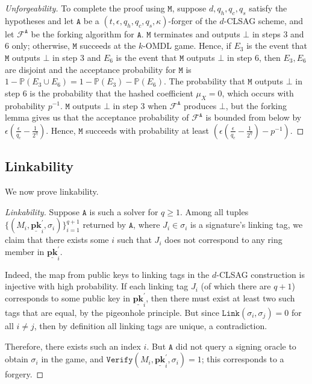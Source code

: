 \documentclass[draft]{llncs} %
\begin{document}
\begin{proof}[Unforgeability]
To complete the proof using $\texttt{M}$, suppose $d, q_h, q_c, q_s$ satisfy the hypotheses and let $\texttt{A}$ be a $(t, \epsilon, q_h, q_c, q_s, \kappa)$-forger of the $d$-CLSAG scheme, and let $\mathcal{F}^{\texttt{A}}$ be the forking algorithm for $\texttt{A}$. $\texttt{M}$ terminates and outputs $\bot$ in steps $3$ and $6$ only; otherwise, $\texttt{M}$ succeeds at the $k$-OMDL game. Hence, if $E_3$ is the event that $\texttt{M}$ outputs $\bot$ in step $3$ and $E_6$ is the event that $\texttt{M}$ outputs $\bot$ in step $6$, then $E_3, E_6$ are disjoint and the acceptance probability for $\texttt{M}$ is $1 - \mathbb{P}(E_3 \cup E_6) =  1 - \mathbb{P}(E_3) - \mathbb{P}(E_6)$. The probability that $\texttt{M}$ outputs $\bot$ in step $6$ is the probability that the hashed coefficient $\mu_X = 0$, which occurs with probability $p^{-1}$.  $\texttt{M}$ outputs $\bot$ in step $3$ when $\mathcal{F}^{\texttt{A}}$ produces $\bot$, but the forking lemma gives us that the acceptance probability of $\mathcal{F}^\texttt{A}$ is bounded from below by $\epsilon\left(\frac{\epsilon}{q_c} - \frac{1}{2^\eta}\right)$. Hence, $\texttt{M}$ succeeds with probability at least $ \left(\epsilon\left(\frac{\epsilon}{q_c} - \frac{1}{2^\eta}\right) - p^{-1}\right)$.
\end{proof}


\subsection{Linkability}
We now prove linkability.

\begin{proof}[Linkability]
Suppose $\texttt{A}$ is such a solver for $q \geq 1$. Among all tuples $\{(M_i, \underline{\textbf{pk}}_i^\prime, \sigma_i)\}_{i=1}^{q+1}$ returned by $\texttt{A}$, where $J_i \in \sigma_i$ is a signature's linking tag, we claim that there exists some $i$ such that $J_i$ does not correspond to any ring member in $\underline{\textbf{pk}}_i^\prime$.

Indeed, the map from public keys to linking tags in the $d$-CLSAG construction is injective with high probability. If each linking tag $J_i$ (of which there are $q + 1$) corresponds to some public key in $\underline{\textbf{pk}}_i^\prime$, then there must exist at least two such tags that are equal, by the pigeonhole principle. But since $\texttt{Link}(\sigma_i,\sigma_j) = 0$ for all $i \neq j$, then by definition all linking tags are unique, a contradiction.

Therefore, there exists such an index $i$. But $\texttt{A}$ did not query a signing oracle to obtain $\sigma_i$ in the game, and $\texttt{Verify}(M_i, \underline{\textbf{pk}}_i^\prime, \sigma_i) = 1$; this corresponds to a forgery.
\end{proof}
\end{document}
